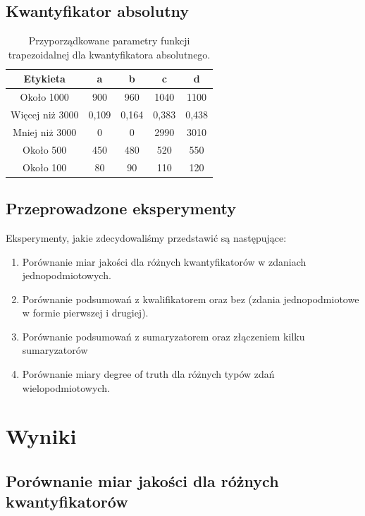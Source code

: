 \documentclass{classrep}
\begin{document}
	\subsection{Kwantyfikator absolutny}
	\begin{table}[h!]
		\centering
		\begin{tabular} {c c c c c}
			\hline
			\textbf{Etykieta} & \textbf{a} & \textbf{b} & \textbf{c} & \textbf{d} \\ [0.5ex] 
			\hline	
			\hline 
			Około 1000			 & 900 & 960 & 1040 & 1100 \\
			Więcej niż 3000			 & 0,109 & 0,164 & 0,383 & 0,438  \\
			Mniej niż 3000				 & 0 & 0 & 2990 & 3010  \\
			Około 500 		 	 & 450 & 480 & 520 & 550  \\	
			Około 100		 & 80 & 90 & 110 & 120  \\						
			\hline			
		\end{tabular}
		\caption{Przyporządkowane parametry funkcji trapezoidalnej dla kwantyfikatora absolutnego. }
		\label{tabelaKwantyfikatorAbsolutny}
	\end{table}
	
	\subsection{Przeprowadzone eksperymenty}
	Eksperymenty, jakie zdecydowaliśmy przedstawić są następujące:
	\begin{enumerate}
		\item Porównanie miar jakości dla różnych kwantyfikatorów w zdaniach jednopodmiotowych.
		\item Porównanie podsumowań z kwalifikatorem oraz bez (zdania jednopodmiotowe w formie pierwszej i drugiej).
		\item Porównanie podsumowań z sumaryzatorem oraz złączeniem kilku sumaryzatorów
		\item Porównanie miary degree of truth dla różnych typów zdań wielopodmiotowych.
	\end{enumerate}

	\section{Wyniki} %
	\subsection{Porównanie miar jakości dla różnych kwantyfikatorów}
\end{document}

